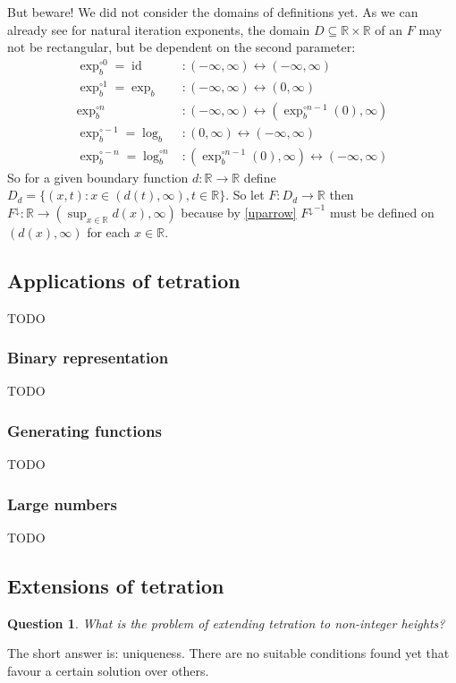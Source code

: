 \documentclass[12pt]{article}
\newtheorem{question}{Question}
\theoremstyle{definition}
\newcommand{\R}{\mathbb{R}}
\DeclareMathOperator{\id}{id}
\begin{document}
But beware! We did not consider the domains of definitions yet. As we
can already see for natural iteration exponents, the domain
$D\subseteq \R\times \R$ of an $F$ may not be rectangular, but
be dependent on the second parameter:
\begin{align*}
  \exp_b^{\circ 0}=\id&\colon (-\infty,\infty)\leftrightarrow(-\infty,\infty)\\
  \exp_b^{\circ 1}=\exp_b&\colon (-\infty,\infty)\leftrightarrow(0,\infty)\\
  \exp_b^{\circ n}&\colon
  (-\infty,\infty)\leftrightarrow(\exp_b^{\circ n-1}(0),\infty)\\
  \exp_b^{\circ -1}=\log_b&\colon (0,\infty)\leftrightarrow (-\infty,\infty)\\
  \exp_b^{\circ -n}=\log_b^{\circ n}&\colon (\exp_b^{\circ n-1}(0),\infty)\leftrightarrow (-\infty,\infty)
\end{align*}
So for a given boundary function $d\colon \R\to\R$ define
$D_d=\{(x,t)\colon x\in(d(t),\infty),t\in\R\}$. So let $F\colon
D_d\to \R$ then $F^{\downarrow}\colon \R\to (\sup_{x\in\R}
d(x),\infty)$ because by
\eqref{uparrow} ${F^{\downarrow}}^{-1}$ must be defined on
$(d(x),\infty)$ for each $x\in\R$.

\subsection{Applications of tetration}
TODO
\subsubsection{Binary representation}
TODO
\subsubsection{Generating functions}
TODO
\subsubsection{Large numbers}
TODO

\subsection{Extensions of tetration}

\begin{question}
  What is the problem of extending tetration to non-integer heights?
\end{question}
The short answer is: uniqueness. There are no suitable conditions
found yet that favour a certain solution over others. 
\end{document}
